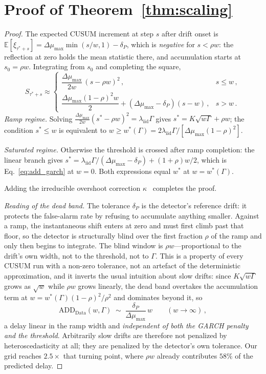 \documentclass[sigconf,anonymous,review]{acmart}
\theoremstyle{acmdefinition}
\begin{document}
\section{Proof of Theorem~\ref{thm:scaling}}\label{app:scaling}

\begin{proof}
    The expected CUSUM increment at step $s$ after drift onset is $\mathbb{E}[\xi_{\tau^*+s}] = \Delta\mu_{\max}\min(s/w, 1) - \delta_P$, which is \emph{negative} for $s < \rho w$: the reflection at zero holds the mean statistic there, and accumulation starts at $s_0 = \rho w$. Integrating from $s_0$ and completing the square,
    \[
        S_{\tau^*+s} \approx
        \begin{cases}
            \dfrac{\Delta\mu_{\max}}{2w}\,(s-\rho w)^2\,,                                   & s \le w\,, \\[6pt]
            \dfrac{\Delta\mu_{\max}(1-\rho)^2 w}{2} + (\Delta\mu_{\max}-\delta_P)(s - w)\,, & s > w\,.
        \end{cases}
    \]
    \emph{Ramp regime.}
    Solving $\frac{\Delta\mu_{\max}}{2w}(s^*-\rho w)^2 = \lambda_{\mathrm{iid}}\Gamma$ gives $s^* = K\sqrt{w\Gamma} + \rho w$; the condition $s^* \le w$ is equivalent to $w \ge w^*(\Gamma) = 2\lambda_{\mathrm{iid}}\Gamma/[\Delta\mu_{\max}(1-\rho)^2]$.

    \emph{Saturated regime.}
    Otherwise the threshold is crossed after ramp completion: the linear branch gives $s^* = \lambda_{\mathrm{iid}}\Gamma/(\Delta\mu_{\max}-\delta_P) + (1+\rho)w/2$, which is Eq.~\eqref{eq:add_garch} at $w = 0$.
    Both expressions equal $w^*$ at $w = w^*(\Gamma)$.

    Adding the irreducible overshoot correction $\kappa$~\cite{siegmund_1985} completes the proof.

    \emph{Reading of the dead band.}
    The tolerance $\delta_P$ is the detector's reference drift: it protects the false-alarm rate by refusing to accumulate anything smaller. Against a ramp, the instantaneous shift enters at zero and must first climb past that floor, so the detector is structurally blind over the first fraction $\rho$ of the ramp and only then begins to integrate. The blind window is $\rho w$---proportional to the drift's own width, not to the threshold, not to $\Gamma$. This is a property of every CUSUM run with a non-zero tolerance, not an artefact of the deterministic approximation, and it inverts the usual intuition about slow drifts: since $K\sqrt{w\Gamma}$ grows as $\sqrt{w}$ while $\rho w$ grows linearly, the dead band overtakes the accumulation term at $w = w^*(\Gamma)(1-\rho)^2/\rho^2$ and dominates beyond it, so
    \[
        \mathrm{ADD}_{\mathrm{Data}}(w, \Gamma) \;\sim\; \frac{\delta_P}{\Delta\mu_{\max}}\, w
        \qquad (w \to \infty)\,,
    \]
    a delay linear in the ramp width and \emph{independent of both the GARCH penalty and the threshold}. Arbitrarily slow drifts are therefore not penalized by heteroscedasticity at all; they are penalized by the detector's own tolerance. Our grid reaches $2.5\times$ that turning point, where $\rho w$ already contributes $58\%$ of the predicted delay.


\end{proof}
\end{document}
